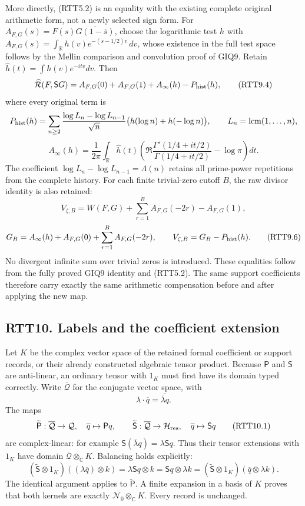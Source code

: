 More directly, (RTT5.2) is an equality with the existing complete
original arithmetic form, not a newly selected sign form. For
\(A_{F,G}(s)=F(s)\overline{G(1-\overline s)}\), choose the logarithmic
test \(h\) with \(A_{F,G}(s)=\int_{\mathbb R}h(v)e^{-(s-1/2)v}\,dv\),
whose existence in the full test space follows by the Mellin comparison
and convolution proof of GIQ9. Retain
\(\widehat h(t)=\int h(v)e^{-itv}dv\). Then \[
\widehat{\mathcal R}(F,\mathsf S G)
=A_{F,G}(0)+A_{F,G}(1)+A_\infty(h)-P_{\rm hist}(h),
\tag{RTT9.4}
\] where every original term is \[
P_{\rm hist}(h)=\sum_{n\ge2}
\frac{\log L_n-\log L_{n-1}}{\sqrt n}
\bigl(h(\log n)+h(-\log n)\bigr),
\qquad L_n=\operatorname{lcm}(1,\ldots,n),
\] \[
A_\infty(h)=\frac1{2\pi}\int_{\mathbb R}\widehat h(t)
\left(\Re\frac{\Gamma'(1/4+it/2)}{\Gamma(1/4+it/2)}-\log\pi\right)dt.
\tag{RTT9.5}
\] The coefficient \(\log L_n-\log L_{n-1}=\Lambda(n)\) retains all
prime-power repetitions from the complete history. For each finite
trivial-zero cutoff \(B\), the raw divisor identity is also retained: \[
V_{\zeta,B}=W(F,G)+\sum_{r=1}^B A_{F,G}(-2r)-A_{F,G}(1),
\] \[
G_B=A_\infty(h)+A_{F,G}(0)+\sum_{r=1}^B A_{F,G}(-2r),
\qquad V_{\zeta,B}=G_B-P_{\rm hist}(h).
\tag{RTT9.6}
\] No divergent infinite sum over trivial zeros is introduced. These
equalities follow from the fully proved GIQ9 identity and (RTT5.2). The
same support coefficients therefore carry exactly the same arithmetic
compensation before and after applying the new map.

\subsection{RTT10. Labels and the coefficient
extension}\label{rtt10.-labels-and-the-coefficient-extension}

Let \(K\) be the complex vector space of the retained formal coefficient
or support records, or their already constructed algebraic tensor
product. Because \(\mathsf P\) and \(\mathsf S\) are anti-linear, an
ordinary tensor with \(1_K\) must first have its domain typed correctly.
Write \(\overline{\mathcal Q}\) for the conjugate vector space, with \[
\lambda\cdot\overline q=\overline{\overline\lambda q}.
\] The maps \[
\widetilde{\mathsf P}:\overline{\mathcal Q}\to\mathcal Q,
\quad \overline q\mapsto\mathsf Pq,
\qquad
\widetilde{\mathsf S}:\overline{\mathcal Q}\to\mathcal H_{\rm res},
\quad \overline q\mapsto\mathsf Sq
\tag{RTT10.1}
\] are complex-linear: for example
\(\mathsf S(\overline\lambda q)=\lambda\mathsf Sq\). Thus their tensor
extensions with \(1_K\) have domain
\(\overline{\mathcal Q}\otimes_{\mathbb C}K\). Balancing holds
explicitly: \[
(\widetilde{\mathsf S}\otimes1_K)((\lambda\overline q)\otimes k)
=\lambda\mathsf Sq\otimes k
=\mathsf Sq\otimes\lambda k
=(\widetilde{\mathsf S}\otimes1_K)(\overline q\otimes\lambda k).
\tag{RTT10.2}
\] The identical argument applies to \(\widetilde{\mathsf P}\). A finite
expansion in a basis of \(K\) proves that both kernels are exactly
\(\overline{\mathcal N_0}\otimes_{\mathbb C}K\). Every record is
unchanged.

